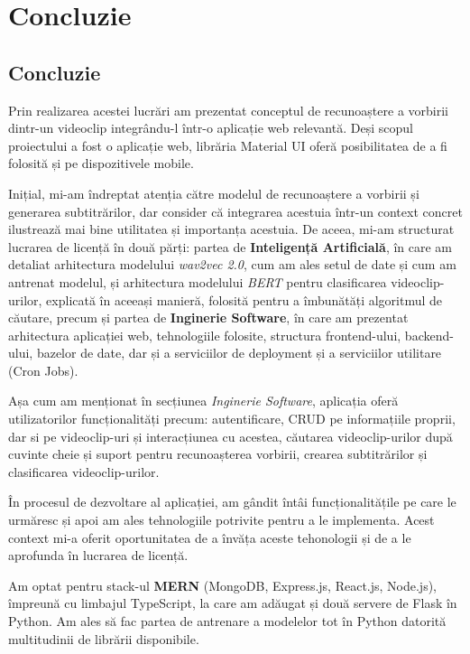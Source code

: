 \chapter{Concluzie}

\section{Concluzie}
Prin realizarea acestei lucrări am prezentat conceptul de recunoaștere a vorbirii dintr-un videoclip 
integrându-l într-o aplicație web relevantă. Deși scopul proiectului a fost o aplicație web,
librăria Material UI oferă posibilitatea de a fi folosită și pe dispozitivele mobile.
\par
Inițial, mi-am îndreptat atenția către modelul de recunoaștere a vorbirii și generarea subtitrărilor,
dar consider că  integrarea acestuia într-un context concret ilustrează mai bine utilitatea și
importanța acestuia. De aceea, mi-am structurat lucrarea de licență în două părți: partea de
\textbf{Inteligență Artificială}, în care am detaliat arhitectura modelului \textit{wav2vec 2.0},
cum am ales setul de date și cum am antrenat modelul, și arhitectura modelului \textit{BERT}
pentru clasificarea videoclip-urilor, explicată în aceeași manieră, folosită pentru a îmbunătăți
algoritmul de căutare, precum și partea de \textbf{Inginerie Software}, în care am prezentat arhitectura
aplicației web, tehnologiile folosite, structura frontend-ului, backend-ului, bazelor de date,
dar și a serviciilor de deployment și a serviciilor utilitare (Cron Jobs).
\par
Așa cum am menționat în secțiunea \textit{Inginerie Software}, aplicația oferă utilizatorilor
funcționalități precum: autentificare, CRUD pe informațiile proprii, dar si pe videoclip-uri și
interacțiunea cu acestea, căutarea videoclip-urilor după cuvinte cheie și suport pentru recunoașterea
vorbirii, crearea subtitrărilor și clasificarea videoclip-urilor.
\par
În procesul de dezvoltare al aplicației, am gândit întâi funcționalitățile pe care le urmăresc
și apoi am ales tehnologiile potrivite pentru a le implementa. Acest context mi-a oferit 
oportunitatea de a învăța aceste tehonologii și de a le aprofunda în lucrarea de licență.
\par
Am optat pentru stack-ul \textbf{MERN} (MongoDB, Express.js, React.js, Node.js), împreună cu 
limbajul TypeScript, la care am adăugat și două servere de Flask în Python. Am ales să fac partea
de antrenare a modelelor tot în Python datorită multitudinii de librării disponibile.
